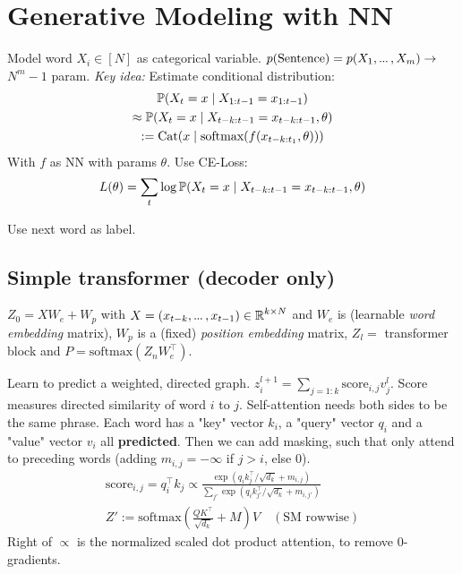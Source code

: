 \section{Generative Modeling with NN}
Model word \(X_i \in [N]\) as categorical variable. \(p(\text{Sentence}) = p(X_1, \sdots, X_m) \to\) \(N^m - 1\) param.
\textit{Key idea:} Estimate conditional distribution:
\begin{gather*}
  \P(X_t = x \mid X_{1:t-1} = x_{1:t-1}) \\ 
  \approx \P(X_t = x \mid X_{t-k:t-1} = x_{t-k:t-1}, \theta) \\
  := \cat(x \mid \text{softmax}(f(x_{t-k:t_1}, \theta)))
\end{gather*}
With \(f\) as NN with params \(\theta\). Use CE-Loss:
\[L(\theta) = \sum_t \log \P(X_t = x \mid X_{t-k:t-1} = x_{t-k:t-1}, \theta)\]

\begin{definition}
  Use next word as label.
\end{definition}

\subsection{Simple transformer (decoder only)}
\begin{definition}
  \(Z_0 = XW_e + W_p\) with \(X = (x_{t-k}, \sdots, x_{t-1}) \in \R^{k \times N}\) and \(W_e\) is (learnable \textit{word embedding} matrix), \(W_p\) is a (fixed) \textit{position embedding} matrix, \(Z_l = \) transformer block and \(P = \text{softmax}(Z_nW_e^\top)\).
\end{definition}

\begin{definition}
  Learn to predict a weighted, directed graph. \(z_i^{l+1} = \sum_{j=1:k} \text{score}_{i, j}v_j^l\). Score measures directed similarity of word \(i\) to \(j\). Self-attention needs both sides to be the same phrase.
  Each word has a "key" vector \(k_i\), a "query" vector \(q_i\) and a "value" vector \(v_i\) all \textbf{predicted}.
  Then we can add masking, such that only attend to preceding words (adding \(m_{i, j} = - \infty\) if \(j > i\), else 0).
  \begin{gather*}
    \text{score}_{i, j} = q_i^\top k_j \propto \frac{\exp(q_i k_j^\top / \sqrt{d_k} + m_{i,j})}{\sum_{j'}\exp(q_i k_{j'}^\top / \sqrt{d_k} + m_{i,j'})} \\
    Z' := \text{softmax}\left(\frac{QK^\top}{\sqrt{d_k}} + M\right)V \quad (\text{SM rowwise})
  \end{gather*}
  Right of \(\propto\) is the normalized scaled dot product attention, to remove \(0\)-gradients.
\end{definition}

